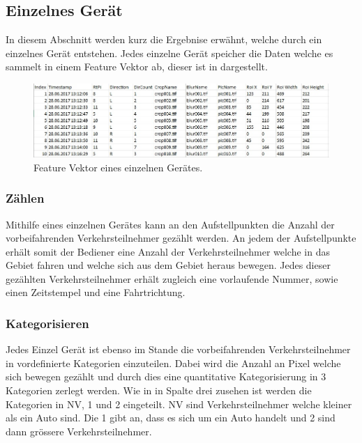 \subsection{Einzelnes Gerät}
In diesem Abschnitt werden kurz die Ergebnise erwähnt, welche durch ein einzelnes Gerät entstehen. Jedes einzelne Gerät speicher die Daten welche es sammelt in einem Feature Vektor ab, dieser ist in  dargestellt. 

\begin{figure}[H]
  \centering
  \includegraphics[width=1\textwidth]{Resultate/FeatureVector.jpg} 
  \caption{Feature Vektor eines einzelnen Gerätes.}
  \label{bFVec}
\end{figure}

\subsubsection{Zählen}
Mithilfe eines einzelnen Gerätes kann an den Aufstellpunkten die Anzahl der vorbeifahrenden Verkehrsteilnehmer gezählt werden. An jedem der Aufstellpunkte erhält somit der Bediener eine Anzahl der Verkehrsteilnehmer welche in das Gebiet fahren und welche sich aus dem Gebiet heraus bewegen. Jedes dieser gezählten Verkehrsteilnehmer erhält zugleich eine vorlaufende Nummer, sowie einen Zeitstempel und eine Fahrtrichtung.

\subsubsection{Kategorisieren}
Jedes Einzel Gerät ist ebenso im Stande die vorbeifahrenden Verkehrsteilnehmer in vordefinierte Kategorien einzuteilen. Dabei wird die Anzahl an Pixel welche sich bewegen gezählt und durch dies eine quantitative Kategorisierung in 3 Kategorien zerlegt werden. Wie in  in Spalte drei zusehen ist werden die Kategorien in NV, 1 und 2 eingeteilt. NV sind Verkehrsteilnehmer welche kleiner als ein Auto sind. Die 1 gibt an, dass es sich um ein Auto handelt und 2 sind dann grössere Verkehrsteilnehmer.

